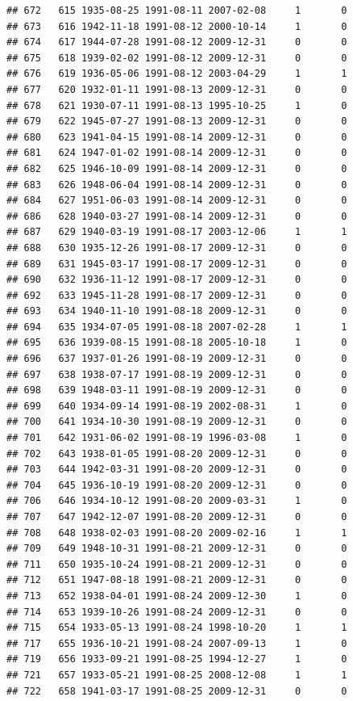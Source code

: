 \documentclass[
]{book}
\theoremstyle{definition}
\theoremstyle{definition}
\theoremstyle{definition}
\theoremstyle{definition}
\theoremstyle{remark}
\begin{document}
\begin{verbatim}
## 672   615 1935-08-25 1991-08-11 2007-02-08     1       0
## 673   616 1942-11-18 1991-08-12 2000-10-14     1       0
## 674   617 1944-07-28 1991-08-12 2009-12-31     0       0
## 675   618 1939-02-02 1991-08-12 2009-12-31     0       0
## 676   619 1936-05-06 1991-08-12 2003-04-29     1       1
## 677   620 1932-01-11 1991-08-13 2009-12-31     0       0
## 678   621 1930-07-11 1991-08-13 1995-10-25     1       0
## 679   622 1945-07-27 1991-08-13 2009-12-31     0       0
## 680   623 1941-04-15 1991-08-14 2009-12-31     0       0
## 681   624 1947-01-02 1991-08-14 2009-12-31     0       0
## 682   625 1946-10-09 1991-08-14 2009-12-31     0       0
## 683   626 1948-06-04 1991-08-14 2009-12-31     0       0
## 684   627 1951-06-03 1991-08-14 2009-12-31     0       0
## 686   628 1940-03-27 1991-08-14 2009-12-31     0       0
## 687   629 1940-03-19 1991-08-17 2003-12-06     1       1
## 688   630 1935-12-26 1991-08-17 2009-12-31     0       0
## 689   631 1945-03-17 1991-08-17 2009-12-31     0       0
## 690   632 1936-11-12 1991-08-17 2009-12-31     0       0
## 692   633 1945-11-28 1991-08-17 2009-12-31     0       0
## 693   634 1940-11-10 1991-08-18 2009-12-31     0       0
## 694   635 1934-07-05 1991-08-18 2007-02-28     1       1
## 695   636 1939-08-15 1991-08-18 2005-10-18     1       0
## 696   637 1937-01-26 1991-08-19 2009-12-31     0       0
## 697   638 1938-07-17 1991-08-19 2009-12-31     0       0
## 698   639 1948-03-11 1991-08-19 2009-12-31     0       0
## 699   640 1934-09-14 1991-08-19 2002-08-31     1       0
## 700   641 1934-10-30 1991-08-19 2009-12-31     0       0
## 701   642 1931-06-02 1991-08-19 1996-03-08     1       0
## 702   643 1938-01-05 1991-08-20 2009-12-31     0       0
## 703   644 1942-03-31 1991-08-20 2009-12-31     0       0
## 704   645 1936-10-19 1991-08-20 2009-12-31     0       0
## 706   646 1934-10-12 1991-08-20 2009-03-31     1       0
## 707   647 1942-12-07 1991-08-20 2009-12-31     0       0
## 708   648 1938-02-03 1991-08-20 2009-02-16     1       1
## 709   649 1948-10-31 1991-08-21 2009-12-31     0       0
## 711   650 1935-10-24 1991-08-21 2009-12-31     0       0
## 712   651 1947-08-18 1991-08-21 2009-12-31     0       0
## 713   652 1938-04-01 1991-08-24 2009-12-30     1       0
## 714   653 1939-10-26 1991-08-24 2009-12-31     0       0
## 715   654 1933-05-13 1991-08-24 1998-10-20     1       1
## 717   655 1936-10-21 1991-08-24 2007-09-13     1       0
## 719   656 1933-09-21 1991-08-25 1994-12-27     1       0
## 721   657 1933-05-21 1991-08-25 2008-12-08     1       1
## 722   658 1941-03-17 1991-08-25 2009-12-31     0       0

\end{verbatim}
\end{document}
